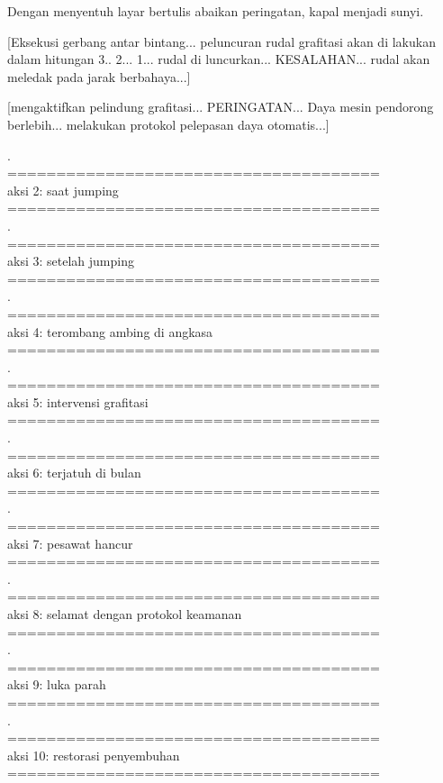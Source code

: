 Dengan menyentuh layar bertulis abaikan peringatan, kapal menjadi sunyi.

[Eksekusi gerbang antar bintang... peluncuran rudal grafitasi akan di lakukan dalam hitungan 3.. 2... 1... rudal di luncurkan... KESALAHAN... rudal akan meledak pada jarak berbahaya...]

[mengaktifkan pelindung grafitasi... PERINGATAN... Daya mesin pendorong berlebih... melakukan protokol pelepasan daya otomatis...]


.\\
======================================\\
aksi 2: saat jumping\\
======================================\\
.\\
======================================\\
aksi 3: setelah jumping\\
======================================\\
.\\
======================================\\
aksi 4: terombang ambing di angkasa\\
======================================\\
.\\
======================================\\
aksi 5: intervensi grafitasi\\
======================================\\
.\\
======================================\\
aksi 6: terjatuh di bulan\\
======================================\\
.\\
======================================\\
aksi 7: pesawat hancur\\
======================================\\
.\\
======================================\\
aksi 8: selamat dengan protokol keamanan\\
======================================\\
.\\
======================================\\
aksi 9: luka parah\\
======================================\\
.\\
======================================\\
aksi 10: restorasi penyembuhan\\
======================================\\